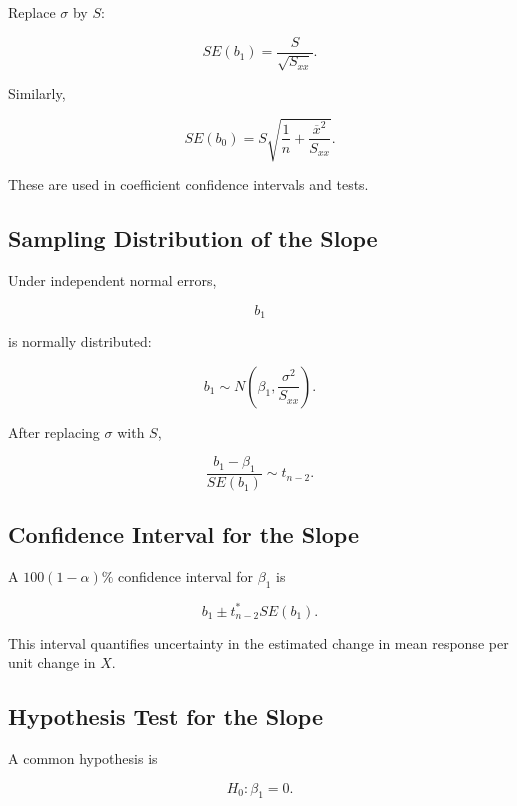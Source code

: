 Replace \(\sigma\) by \(S\):

\[
\boxed{
SE(b_1)
=
\frac{
S
}{
\sqrt{S_{xx}}
}.
}
\]

Similarly,

\[
\boxed{
SE(b_0)
=
S
\sqrt{
\frac1n
+
\frac{
\overline{x}^2
}{
S_{xx}
}
}.
}
\]

These are used in coefficient confidence intervals and tests.

\subsection{Sampling Distribution of the Slope}
\label{subsec:sampling-distribution-slope}

Under independent normal errors,

\[
b_1
\]

is normally distributed:

\[
\boxed{
b_1
\sim
N
\left(
\beta_1,
\frac{
\sigma^2
}{
S_{xx}
}
\right).
}
\]

After replacing \(\sigma\) with \(S\),

\[
\boxed{
\frac{
b_1-\beta_1
}{
SE(b_1)
}
\sim
t_{n-2}.
}
\]

\subsection{Confidence Interval for the Slope}
\label{subsec:confidence-interval-slope}

A \(100(1-\alpha)\%\) confidence interval for \(\beta_1\) is

\[
\boxed{
b_1
\pm
t^*_{n-2}
SE(b_1).
}
\]

This interval quantifies uncertainty in the estimated change in mean
response per unit change in \(X\).

\subsection{Hypothesis Test for the Slope}
\label{subsec:hypothesis-test-slope}

A common hypothesis is

\[
\boxed{
H_0:\beta_1=0.
}
\]

